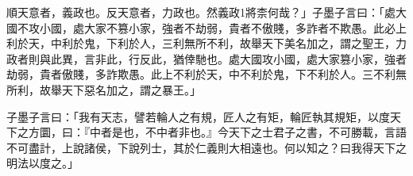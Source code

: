 \begin{pinyinscope}
順天意者，義政也。反天意者，力政也。然義政1將柰何哉？」子墨子言曰：「處大國不攻小國，處大家不篡小家，強者不劫弱，貴者不傲賤，多詐者不欺愚。此必上利於天，中利於鬼，下利於人，三利無所不利，故舉天下美名加之，謂之聖王，力政者則與此異，言非此，行反此，猶倖馳也。處大國攻小國，處大家篡小家，強者劫弱，貴者傲賤，多詐欺愚。此上不利於天，中不利於鬼，下不利於人。三不利無所利，故舉天下惡名加之，謂之暴王。」

子墨子言曰：「我有天志，譬若輪人之有規，匠人之有矩，輪匠執其規矩，以度天下之方圜，曰：『中者是也，不中者非也。』今天下之士君子之書，不可勝載，言語不可盡計，上說諸侯，下說列士，其於仁義則大相遠也。何以知之？曰我得天下之明法以度之。」


\end{pinyinscope}
